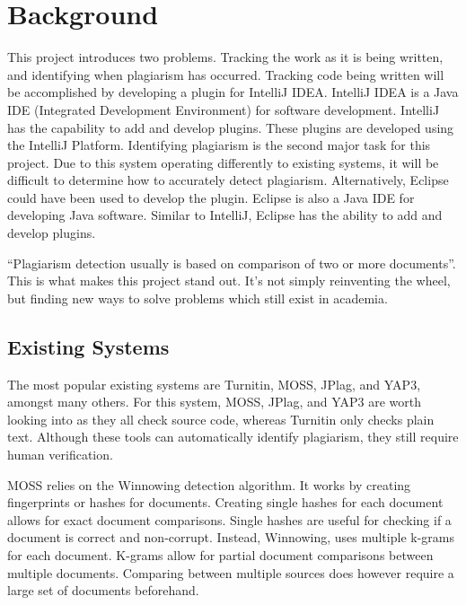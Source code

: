 \chapter{Background}
\label{chp:background}
This project introduces two problems. Tracking the work as it is being written, and identifying when plagiarism has occurred. Tracking code being written will be accomplished by developing a plugin for IntelliJ IDEA. IntelliJ IDEA is a Java IDE (Integrated Development Environment) for software development. IntelliJ has the capability to add and develop plugins. These plugins are developed using the IntelliJ Platform\cite{IntelliJPlatform}. Identifying plagiarism is the second major task for this project. Due to this system operating differently to existing systems, it will be difficult to determine how to accurately detect plagiarism. Alternatively, Eclipse could have been used to develop the plugin. Eclipse is also a Java IDE for developing Java software. Similar to IntelliJ, Eclipse has the ability to add and develop plugins.

``Plagiarism detection usually is based on comparison of two or more documents''\cite{Lukashenko2007}. This is what makes this project stand out. It's not simply reinventing the wheel, but finding new ways to solve problems which still exist in academia.

\section{Existing Systems}
\label{sec:existing-systems}
The most popular existing systems are Turnitin, MOSS, JPlag, and YAP3, amongst many others. For this system, MOSS, JPlag, and YAP3 are worth looking into as they all check source code, whereas Turnitin only checks plain text\cite{Lukashenko2007}. Although these tools can automatically identify plagiarism, they still require human verification.

MOSS relies on the Winnowing detection algorithm\cite{Schleimer2003}. It works by creating fingerprints or hashes for documents. Creating single hashes for each document allows for exact document comparisons. Single hashes are useful for checking if a document is correct and non-corrupt. Instead, Winnowing, uses multiple k-grams for each document. K-grams allow for partial document comparisons between multiple documents. Comparing between multiple sources does however require a large set of documents beforehand.

